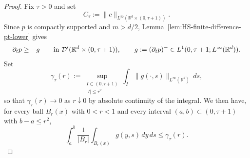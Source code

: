 \documentclass[11pt]{amsart}
\numberwithin{equation}{section}
\numberwithin{figure}{section}
\theoremstyle{plain}
\theoremstyle{definition}
\theoremstyle{remark}
\theoremstyle{plain}
\newcommand{\abs}[1]{\lvert #1 \rvert}
\newcommand{\norm}[1]{\lVert #1 \rVert}
\def\R{\mathbb{R}}
\begin{document}
\begin{proof}
Fix \(\tau>0\) and set
\[
    C_\tau:=\norm{c}_{L^\infty(\R^d\times(0,\tau+1))}.
\]
Since \(p\) is compactly supported and \(m>d/2\),
Lemma~\ref{lem:HS-finite-difference-pt-lower} gives
\begin{equation}\label{eq:HS-representative-time-lower}
    \partial_t p\geq -g
    \qquad\hbox{in }\mathcal D'(\R^d\times(0,\tau+1)),
    \qquad
    g:=(\partial_t p)^-\in L^1(0,\tau+1;L^\infty(\R^d)).
\end{equation}
Set
\[
    \gamma_\tau(r):=
    \sup_{\substack{I\subset(0,\tau+1)\\ \abs{I}\leq r^2}}
    \int_I\norm{g(\cdot,s)}_{L^\infty(\R^d)}\,ds,
\]
so that \(\gamma_\tau(r)\to0\) as \(r\downarrow0\) by absolute continuity
of the integral.  We then have, for every ball \(B_r(x)\) with \(0<r<1\) and every
interval \((a,b)\subset(0,\tau+1)\) with \(b-a\leq r^2\),
\begin{equation}\label{eq:HS-representative-pt-minus-modulus}
    \int_a^b\frac1{\abs{B_r}}\int_{B_r(x)}g(y,s)\,dy\,ds
    \leq \gamma_\tau(r).
\end{equation}


\end{proof}
\end{document}
